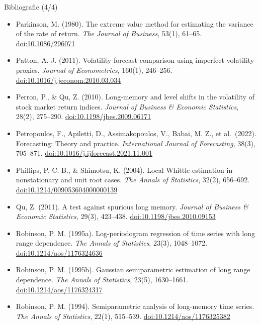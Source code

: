\begin{frame}{Bibliografie (4/4)}
\itemsize{\tiny}
\begin{itemize}
    \item Parkinson, M. (1980). The extreme value method for estimating the variance of the rate of return. \textit{The Journal of Business}, 53(1), 61--65. \href{https://doi.org/10.1086/296071}{doi:10.1086/296071}
    \item Patton, A. J. (2011). Volatility forecast comparison using imperfect volatility proxies. \textit{Journal of Econometrics}, 160(1), 246--256. \href{https://doi.org/10.1016/j.jeconom.2010.03.034}{doi:10.1016/j.jeconom.2010.03.034}
    \item Perron, P., \& Qu, Z. (2010). Long-memory and level shifts in the volatility of stock market return indices. \textit{Journal of Business \& Economic Statistics}, 28(2), 275--290. \href{https://doi.org/10.1198/jbes.2009.06171}{doi:10.1198/jbes.2009.06171}
    \item Petropoulos, F., Apiletti, D., Assimakopoulos, V., Babai, M. Z., et al.\ (2022). Forecasting: Theory and practice. \textit{International Journal of Forecasting}, 38(3), 705--871. \href{https://doi.org/10.1016/j.ijforecast.2021.11.001}{doi:10.1016/j.ijforecast.2021.11.001}
    \item Phillips, P. C. B., \& Shimotsu, K. (2004). Local Whittle estimation in nonstationary and unit root cases. \textit{The Annals of Statistics}, 32(2), 656--692. \href{https://doi.org/10.1214/009053604000000139}{doi:10.1214/009053604000000139}
    \item Qu, Z. (2011). A test against spurious long memory. \textit{Journal of Business \& Economic Statistics}, 29(3), 423--438. \href{https://doi.org/10.1198/jbes.2010.09153}{doi:10.1198/jbes.2010.09153}
    \item Robinson, P. M. (1995a). Log-periodogram regression of time series with long range dependence. \textit{The Annals of Statistics}, 23(3), 1048--1072. \href{https://doi.org/10.1214/aos/1176324636}{doi:10.1214/aos/1176324636}
    \item Robinson, P. M. (1995b). Gaussian semiparametric estimation of long range dependence. \textit{The Annals of Statistics}, 23(5), 1630--1661. \href{https://doi.org/10.1214/aos/1176324317}{doi:10.1214/aos/1176324317}
    \item Robinson, P. M. (1994). Semiparametric analysis of long-memory time series. \textit{The Annals of Statistics}, 22(1), 515--539. \href{https://doi.org/10.1214/aos/1176325382}{doi:10.1214/aos/1176325382}

\end{itemize}
\end{frame}
